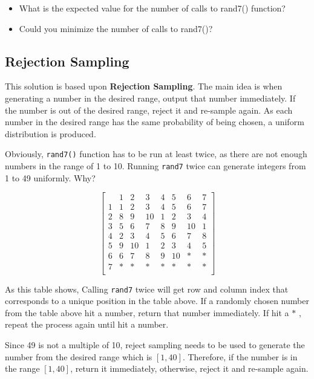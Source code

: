 \begin{itemize}
\item What is the expected value for the number of calls to rand7() function?
\item Could you minimize the number of calls to rand7()?
\end{itemize}

\subsection{Rejection Sampling}

This solution is based upon \textbf{Rejection Sampling}. The main idea is when generating a number in the desired range, output that number immediately. If the number is out of the desired range, reject it and re-sample again. As each number in the desired range has the same probability of being chosen, a uniform distribution is produced.

Obviously, \texttt{rand7()} function has to be run at least twice, as there are not enough numbers in the range of 1 to 10. Running \texttt{rand7} twice can generate integers from 1 to 49 uniformly. Why?

\[
\begin{bmatrix}
 & \mathit{1} & \mathit{2} & \mathit{3} & \mathit{4} & \mathit{5} & \mathit{6} & \mathit{7} \\
\mathit{1} & 1 & 2 & 3 & 4 & 5 & 6 & 7 \\ 
\mathit{2} & 8 & 9 & 10 & 1 & 2 & 3 & 4 \\
\mathit{3} & 5 & 6 & 7 & 8 & 9 & 10 & 1\\
\mathit{4} & 2 & 3 & 4 & 5 & 6 & 7 & 8 \\
\mathit{5} & 9 & 10 & 1 & 2 & 3 & 4 & 5 \\
\mathit{6} & 6 & 7 & 8 & 9 & 10 & \ast & \ast \\
\mathit{7} & \ast & \ast & \ast & \ast & \ast & \ast & \ast \\
\end{bmatrix}
\]

As this table shows, Calling \texttt{rand7} twice will get row and column index that corresponds to a unique position in the table above. If a randomly chosen number from the table above hit a number, return that number immediately. If hit a $\ast$ , repeat the process again until hit a number.

Since 49 is not a multiple of 10, reject sampling needs to be used to generate the number from the desired range which is $[1, 40]$. Therefore, if the number is in the range $[1, 40]$, return it immediately, otherwise, reject it and re-sample again.


